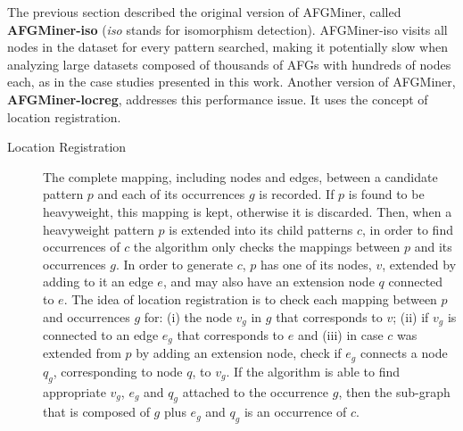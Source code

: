 The previous section described the original version of AFGMiner, called {\bf AFGMiner-iso} (\emph{iso} stands for isomorphism detection). AFGMiner-iso visits all nodes in the dataset for every pattern searched, making it potentially slow when analyzing large datasets composed of thousands of AFGs with hundreds of nodes each, as in the case studies presented in this work. Another version of AFGMiner, {\bf AFGMiner-locreg}, addresses this performance issue. It uses the concept of location registration.
\begin{description}
\item [Location Registration] The complete mapping, including nodes and edges, between a candidate pattern $p$ and each of its occurrences $g$ is recorded. If $p$ is found to be heavyweight, this mapping is kept, otherwise it is discarded. Then, when a heavyweight pattern $p$ is extended into its child patterns $c$, in order to find occurrences of $c$ the algorithm only checks the mappings between $p$ and its occurrences $g$. In order to generate $c$, $p$ has one of its nodes, $v$, extended by adding to it an edge $e$, and may also have an extension node $q$ connected to $e$. The idea of location registration is to check each mapping between $p$ and occurrences $g$ for: (i) the node $v_g$ in $g$ that corresponds to $v$; (ii) if $v_g$ is connected to an edge $e_g$ that corresponds to $e$ and (iii) in case $c$ was extended from $p$ by adding an extension node, check if $e_g$ connects a node $q_g$, corresponding to node $q$, to $v_g$. If the algorithm is able to find appropriate $v_g$, $e_g$ and $q_g$ attached to the occurrence $g$, then the sub-graph that is composed of $g$ plus $e_g$ and $q_g$ is an occurrence of $c$.
\end{description}





